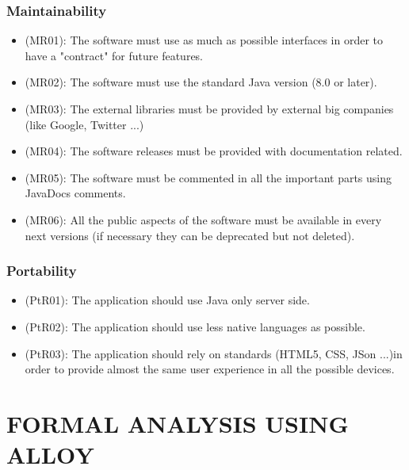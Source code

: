 \documentclass[a4paper,leqno]{book}
\begin{document}
\subsection{Maintainability}
\begin{itemize}
\item (MR01): The software must use as much as possible interfaces in order to have a "contract" for future features.
\item (MR02): The software must use the standard Java version (8.0 or later).
\item (MR03): The external libraries must be provided by external big companies (like Google, Twitter ...)
\item (MR04): The software releases must be provided with documentation related.
\item (MR05): The software must be commented in all the important parts using JavaDocs comments.
\item (MR06): All the public aspects of the software must be available in every next versions (if necessary they can be deprecated but not deleted).
\end{itemize}

\subsection{Portability}
\begin{itemize}
\item (PtR01): The application should use Java only server side.
\item (PtR02): The application should use less native languages as possible.
\item (PtR03): The application should rely on standards (HTML5, CSS, JSon ...)in order to provide almost the same user experience in all the possible devices.
\end{itemize}

\chapter{FORMAL ANALYSIS USING ALLOY}
\end{document}
